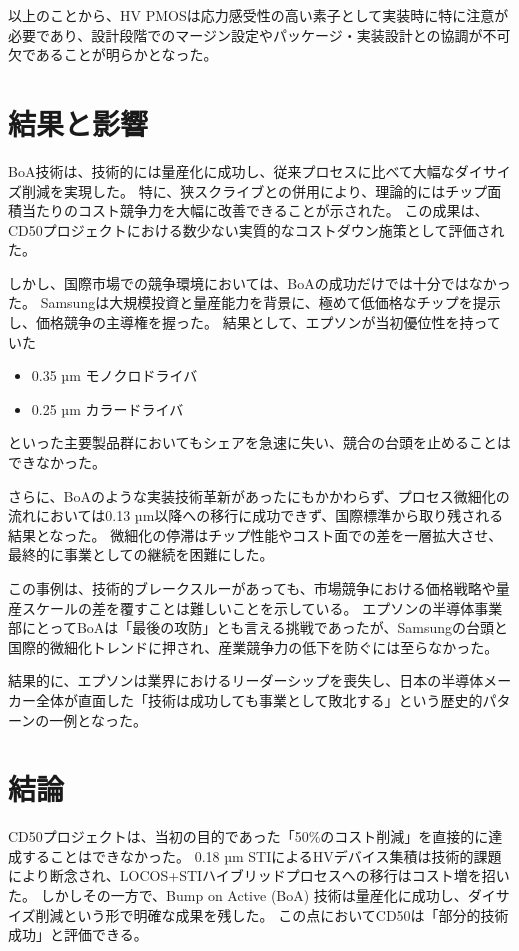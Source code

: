 \documentclass[conference]{IEEEtran}
\begin{document}
\vspace{2mm}
以上のことから、HV PMOSは応力感受性の高い素子として実装時に特に注意が必要であり、設計段階でのマージン設定やパッケージ・実装設計との協調が不可欠であることが明らかとなった。

\section{結果と影響}
BoA技術は、技術的には量産化に成功し、従来プロセスに比べて大幅なダイサイズ削減を実現した。  
特に、狭スクライブとの併用により、理論的にはチップ面積当たりのコスト競争力を大幅に改善できることが示された。  
この成果は、CD50プロジェクトにおける数少ない実質的なコストダウン施策として評価された。

しかし、国際市場での競争環境においては、BoAの成功だけでは十分ではなかった。  
Samsungは大規模投資と量産能力を背景に、極めて低価格なチップを提示し、価格競争の主導権を握った。  
結果として、エプソンが当初優位性を持っていた
\begin{itemize}
  \item 0.35 µm モノクロドライバ
  \item 0.25 µm カラードライバ
\end{itemize}
といった主要製品群においてもシェアを急速に失い、競合の台頭を止めることはできなかった。

さらに、BoAのような実装技術革新があったにもかかわらず、プロセス微細化の流れにおいては0.13 µm以降への移行に成功できず、国際標準から取り残される結果となった。  
微細化の停滞はチップ性能やコスト面での差を一層拡大させ、最終的に事業としての継続を困難にした。

この事例は、技術的ブレークスルーがあっても、市場競争における価格戦略や量産スケールの差を覆すことは難しいことを示している。  
エプソンの半導体事業部にとってBoAは「最後の攻防」とも言える挑戦であったが、Samsungの台頭と国際的微細化トレンドに押され、産業競争力の低下を防ぐには至らなかった。

結果的に、エプソンは業界におけるリーダーシップを喪失し、日本の半導体メーカー全体が直面した「技術は成功しても事業として敗北する」という歴史的パターンの一例となった。

\section{結論}
CD50プロジェクトは、当初の目的であった「50\%のコスト削減」を直接的に達成することはできなかった。  
0.18 µm STIによるHVデバイス集積は技術的課題により断念され、LOCOS+STIハイブリッドプロセスへの移行はコスト増を招いた。  
しかしその一方で、Bump on Active (BoA) 技術は量産化に成功し、ダイサイズ削減という形で明確な成果を残した。  
この点においてCD50は「部分的技術成功」と評価できる。
\end{document}
